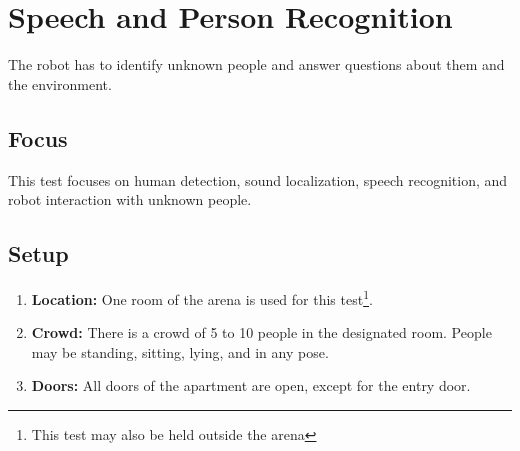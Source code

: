 \section{Speech and Person Recognition}
The robot has to identify unknown people and answer questions about them and the environment.

\subsection{Focus}
This test focuses on human detection, sound localization, speech recognition, and robot interaction with unknown people.

\subsection{Setup}
\begin{enumerate}
    \item \textbf{Location:} One room of the arena is used for this test\footnote{This test may also be held outside the arena}.
    \item \textbf{Crowd:} There is a crowd of 5 to 10 people in the designated room. People may be standing, sitting, lying, and in any pose.
    \item \textbf{Doors:} All doors of the apartment are open, except for the entry door. 
\end{enumerate}

